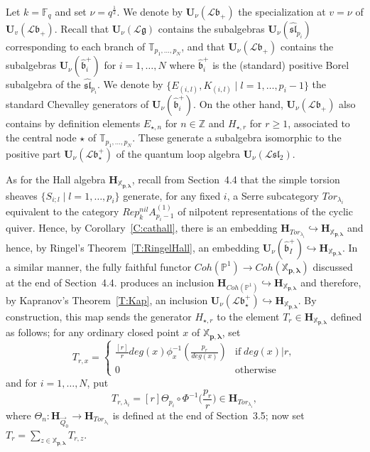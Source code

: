 \documentclass[a4paper,10pt]{amsart}
\def\Z{\mathbb{Z}}
\def\H{\mathbf{H}}
\def\U{\mathbf{U}}
\def\g{\mathfrak{g}}
\def\bo{\mathfrak{b}}
\def\xpl{\mathbb{X}_{\mathbf{p},\boldsymbol{\lambda}}}
\numberwithin{equation}{section}
\begin{document}
{Let $k=\mathbb{F}_q$ and set $\nu=q^{\frac{1}{2}}$. We denote by $\U_{\nu}(\mathcal{L}\bo_+)$ the specialization at $v=\nu$ of $\U_v(\mathcal{L}\bo_+)$. Recall that $\U_{\nu}(\mathcal{L}\g)$ contains the subalgebras $\U_{\nu}(\widehat{\mathfrak{sl}}_{p_i})$ corresponding to each branch of $\mathbb{T}_{p_1, \ldots, p_N}$, and that $\U_{\nu}(\mathcal{L}\bo_+)$ contains the subalgebras $\U_{\nu}(\widehat{\bo}_i^+)$ for $i=1, \ldots, N$ where $\widehat{\bo}_i^+$ is the (standard) positive Borel subalgebra of the $\widehat{\mathfrak{sl}}_{p_i}$. We denote by $\{E_{(i,l)}, K_{(i,l)}\;|\; l=1, \ldots, p_{i}-1\}$ the standard Chevalley generators of $\U_{\nu}(\widehat{\bo}_i^+)$.
On the other hand, $\U_{\nu}(\mathcal{L}\bo_+)$ also contains by definition elements $E_{\star,n}$ for $n \in \Z$ and $H_{\star,r}$ for $r \geq 1$, associated to the central node $\star$ of $\mathbb{T}_{p_1, \ldots, p_N}$. These generate a subalgebra isomorphic to the positive part $\U_{\nu}(\mathcal{L}\bo_{\star}^+)$ of the quantum loop algebra $\U_{\nu}(\mathcal{L}{\mathfrak{sl}}_2)$.

As for the Hall algebra $\H_{\xpl}$, recall from Section~4.4 that the simple torsion sheaves $\{S_{i;l}\;|\; l=1, \ldots, p_i\}$ generate, for any fixed $i$, a Serre subcategory $Tor_{\lambda_i}$ equivalent to the category $Rep^{nil}_kA_{p_i-1}^{(1)}$ of nilpotent representations of the cyclic quiver. Hence, by Corollary~\ref{C:cathall}, there is an embedding $\H_{Tor_{\lambda_i}} \hookrightarrow \H_{\xpl}$ and hence, by Ringel's Theorem~\ref{T:RingelHall}, an embedding $\U_{\nu}(\widehat{\bo}_I^+) \hookrightarrow \H_{\xpl}$. In a similar manner, the fully faithful functor $Coh(\mathbb{P}^1) \to Coh(\xpl)$ discussed at the end of Section~4.4. produces an inclusion $\H_{Coh(\mathbb{P}^1)} \hookrightarrow \H_{\xpl}$ and therefore, by Kapranov's Theorem~\ref{T:Kap}, an inclusion $\U_{\nu}(\mathcal{L}\bo_\star^+) \hookrightarrow \H_{\xpl}$. By construction, this map sends the generator $H_{\star,r}$ to the element $T_r \in \H_{\xpl}$ defined as follows; for any ordinary closed point $x$ of $\xpl$, set
$$T_{r,x}=\begin{cases} \frac{[r]}{r}deg(x) \phi_x^{-1}(\frac{p_r}{deg(x)})& \text{if}\; deg(x) | r,\\
0& \text{otherwise}\end{cases}$$
and for $i=1, \ldots, N$, put
$$T_{r,{\lambda_i}}=[r]\Theta_{p_i} \circ \Phi^{-1}\bigg(\frac{p_r}{r}\bigg) \in \H_{Tor_{\lambda_i}},$$
where $\Theta_n: \H_{\vec{Q}_0} \to \H_{Tor_{\lambda_i}}$ is defined at the end of Section~3.5; now set
$T_r=\sum_{z \in \xpl} T_{r,z}$.

}
\end{document}

